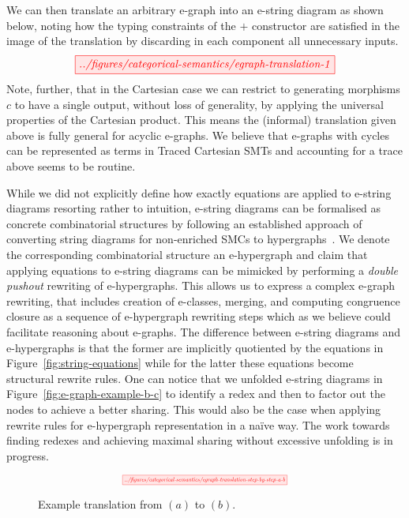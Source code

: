\documentclass[sigconf, 9pt, nonacm]{acmart}
\begin{document}
We can then translate an arbitrary e-graph into an e-string diagram as shown below, noting how the typing constraints of the $+$ constructor are satisfied in the image of the translation by discarding in each component all unnecessary inputs.
\[
    \tikzfig{../figures/categorical-semantics/egraph-translation-1}
\]
Note, further, that in the Cartesian case we can restrict to generating morphisms $c$ to have a single output,  without loss of generality,  by applying the universal properties of the Cartesian product.  This means the (informal) translation given above is fully general for acyclic e-graphs.
We believe that e-graphs with cycles can be represented as terms in Traced Cartesian SMTs and accounting for a trace above seems to be routine.


While we did not explicitly define how exactly equations are applied to e-string diagrams resorting rather to intuition, e-string diagrams can be formalised as concrete combinatorial structures by following an established approach of converting string diagrams for non-enriched SMCs to hypergraphs~\cite{bonchi_string_2022,bonchi_string_2022-1,bonchi_string_2022-2}.
We denote the corresponding combinatorial structure an e-hypergraph and claim that applying equations to e-string diagrams can be mimicked by performing a \textit{double pushout} rewriting of e-hypergraphs.
This allows us to express a complex e-graph rewriting, that includes creation of e-classes, merging, and computing congruence closure as a sequence of e-hypergraph rewriting steps which as we believe could facilitate reasoning about e-graphs.
The difference between e-string diagrams and e-hypergraphs is that the former are implicitly quotiented by the equations in Figure~\ref{fig:string-equations} while for the latter these equations become structural rewrite rules.
One can notice that we unfolded e-string diagrams in Figure~\ref{fig:e-graph-example-b-c} to identify a redex and then to factor out the nodes to achieve a better sharing.
This would also be the case when applying rewrite rules for e-hypergraph representation in a na\"ive way.
The work towards finding redexes and achieving maximal sharing without excessive unfolding is in progress.

\begin{figure*}
    \[
        \scalebox{0.5}{
        \tikzfig{../figures/categorical-semantics/egraph-translation-step-by-step-a-b}
        }
    \]
    \caption{Example translation from $(a)$ to $(b)$.}
    \label{fig:e-graph-example-a-b}
\end{figure*}
\end{document}
